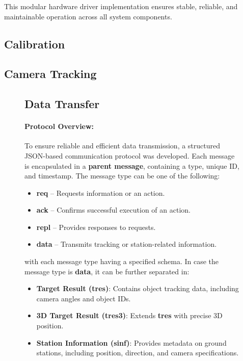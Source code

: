 This modular hardware driver implementation ensures stable, reliable, and maintainable operation across all system components.


\subsection{Calibration}

\subsection{Camera Tracking}

\newpage
\begin{figure}[H]
	\subsection{Data Transfer} \label{subsec:DataTransfer}
	\centering
	\begin{minipage}{0.5\textwidth} %
		\raggedright %
		\paragraph{Protocol Overview:}
		
		To ensure reliable and efficient data transmission, a structured JSON-based communication protocol was developed. Each message is encapsulated in a \textbf{parent message}, containing a type, unique ID, and timestamp. The message type can be one of the following:
		
		\begin{itemize}
			\item \textbf{req} – Requests information or an action.
			\item \textbf{ack} – Confirms successful execution of an action.
			\item \textbf{repl} – Provides responses to requests.
			\item \textbf{data} – Transmits tracking or station-related information.
		\end{itemize}
		
		with each message type having a specified schema. In case the message type is \textbf{data}, it can be further separated in:
		
		\begin{itemize}
			\item \textbf{Target Result (tres)}: Contains object tracking data, including camera angles and object IDs.
			\item \textbf{3D Target Result (tres3)}: Extends \textbf{tres} with precise 3D position.
			\item \textbf{Station Information (sinf)}: Provides metadata on ground stations, including position, direction, and camera specifications.
		\end{itemize}
		

\end{minipage}
\end{figure}
